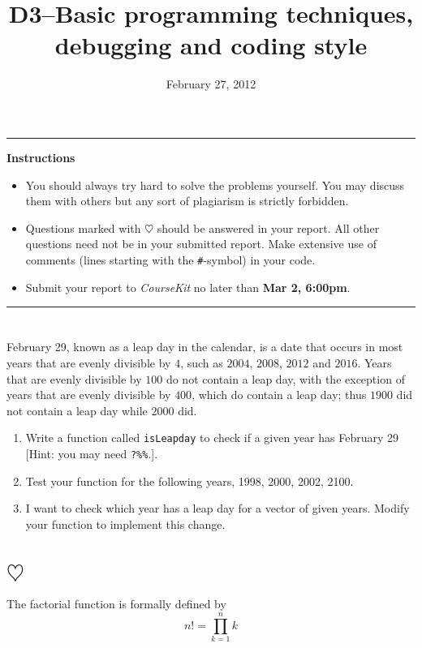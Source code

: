 \documentclass[a4paper]{article}
\title{D3--Basic programming techniques, debugging and coding style}
\date{February 27, 2012}
\begin{document}
\maketitle
\hrule
\begin{center}
\textbf{Instructions}
\end{center}
\begin{itemize}
\item You should always try hard to solve the problems yourself. You may
  discuss them with others but any sort of plagiarism is strictly forbidden.  
\item Questions marked with $\heartsuit$ should be answered in your report. All
  other questions need not be in your submitted report. Make extensive use of
  comments (lines starting with the \texttt{\#}-symbol) in your code.
\item Submit your report to \emph{CourseKit} no later than \textbf{Mar 2,
    6:00pm}. 
\end{itemize}
\hrule
  
\section{}
February 29, known as a leap day in the calendar, is a date that occurs
  in most years that are evenly divisible by $4$, such as $2004$, $2008$,
  $2012$ and $2016$. Years that are evenly divisible by $100$ do not contain a
  leap day, with the exception of years that are evenly divisible by $400$,
  which do contain a leap day; thus $1900$ did not contain a leap day while
  $2000$ did.
\begin{enumerate}

\item Write a function called \texttt{isLeapday} to check if a given year has
  February 29 [Hint:  you may need \texttt{?\%\%}.].  

\item Test your function for the following years, 1998, 2000, 2002, 2100.

\item I want to check which year has a leap day for a vector of given
  years. Modify your function to implement this change. 
\end{enumerate}

\section{$\heartsuit$}
The factorial function is formally defined by
\begin{equation*}
  \label{eq:1}
    n!=\prod_{k=1}^n k \! 
\end{equation*}
\end{document}

